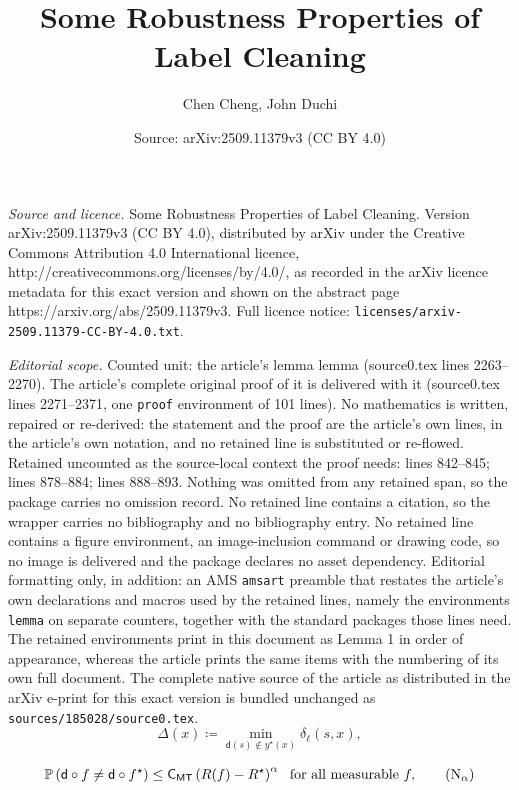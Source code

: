 \documentclass[10pt,a4paper]{amsart}
\title{Some Robustness Properties of Label Cleaning}
\author{Chen Cheng, John Duchi}
\date{Source: arXiv:2509.11379v3 (CC BY 4.0)}
\renewcommand{\P}{\mathbb{P}} %
\newcommand{\constant}{\mathsf{C}}  %
\newcommand{\cstMT}{\constant_{\mathsf{MT}}}
\newcommand{\defeq}{\coloneqq}
\newcommand{\extloss}{\delta_\tloss}
\newcommand{\opt}{^\star} %
\newcommand{\pred}{\mathsf{d}}  %
\newcommand{\tloss}{\ell}  %
\begin{document}
\maketitle

\noindent\emph{Source and licence.} Some Robustness Properties of Label Cleaning. Version arXiv:2509.11379v3 (CC BY 4.0), distributed by arXiv under the Creative Commons Attribution 4.0 International licence, http://creativecommons.org/licenses/by/4.0/, as recorded in the arXiv licence metadata for this exact version and shown on the abstract page https://arxiv.org/abs/2509.11379v3. Full licence notice: \texttt{licenses/arxiv-2509.11379-CC-BY-4.0.txt}.\par\smallskip

\noindent\textit{Editorial scope.} Counted unit: the article's lemma lemma (source0.tex lines 2263--2270). The article's complete original proof of it is delivered with it (source0.tex lines 2271--2371, one \texttt{proof} environment of 101 lines). No mathematics is written, repaired or re-derived: the statement and the proof are the article's own lines, in the article's own notation, and no retained line is substituted or re-flowed.  Retained uncounted as the source-local context the proof needs: lines 842--845; lines 878--884; lines 888--893.  Nothing was omitted from any retained span, so the package carries no omission record.  No retained line contains a citation, so the wrapper carries no bibliography and no bibliography entry.  No retained line contains a figure environment, an image-inclusion command or drawing code, so no image is delivered and the package declares no asset dependency.  Editorial formatting only, in addition: an AMS \texttt{amsart} preamble that restates the article's own declarations and macros used by the retained lines, namely the environments \texttt{lemma} on separate counters, together with the standard packages those lines need.  The retained environments print in this document as Lemma 1 in order of appearance, whereas the article prints the same items with the numbering of its own full document.  The complete native source of the article as distributed in the arXiv e-print for this exact version is bundled unchanged as \texttt{sources/185028/source0.tex}.
\begin{equation}
  \label{eqn:minimal-wrong-excess-risk}
  \Delta(x) \defeq \min_{\pred(s) \not\in y\opt(x)} \extloss(s, x),
\end{equation}

\begin{equation}
  \label{eqn:mammen-alpha}
  \P\left(\pred \circ f \neq \pred \circ f\opt\right)
  \le \cstMT \left(R(f) - R\opt\right)^\alpha
  ~~ \mbox{for~all~measurable}~ f,
  \tag{N{$_\alpha$}}
\end{equation}
\end{document}
